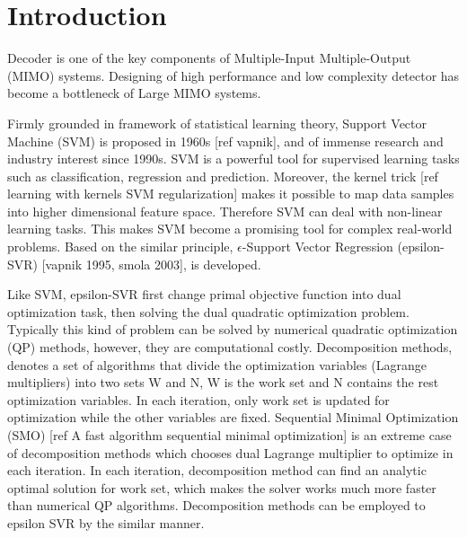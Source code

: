 \documentclass[12pt, draftclsnofoot, onecolumn]{IEEEtran}
\begin{document}
\section{Introduction}
% 
% 
% 
% 

 
Decoder is one of the key components of Multiple-Input Multiple-Output (MIMO) systems. Designing of high performance and low complexity detector has become a bottleneck of Large MIMO systems. 

Firmly grounded in framework of statistical learning theory, Support Vector Machine (SVM) is proposed in 1960s [ref vapnik], and of immense research and industry interest since 1990s. SVM is a powerful tool for supervised learning tasks such as classification, regression and prediction. Moreover, the kernel trick [ref learning with kernels SVM regularization] makes it possible to map data samples into higher dimensional feature space. Therefore SVM can deal with non-linear learning tasks. This makes SVM become a promising tool for complex real-world problems.
Based on the similar principle, $\epsilon$-Support Vector Regression (epsilon-SVR) [vapnik 1995, smola 2003], is developed.

Like SVM, epsilon-SVR first change primal objective function into dual optimization task, then solving the dual quadratic optimization problem. Typically this kind of problem can be solved by numerical quadratic optimization (QP) methods, however, they are computational costly. Decomposition methods, denotes a set of algorithms that divide the optimization variables (Lagrange multipliers) into two sets W and N, W is the work set and N contains the rest optimization variables.  In each iteration, only work set is updated for optimization while the other variables are fixed. Sequential Minimal Optimization (SMO) [ref A fast algorithm sequential minimal optimization] is an extreme case of decomposition methods which chooses dual Lagrange multiplier to optimize in each iteration. In each iteration, decomposition method can find an analytic optimal solution for work set, which makes the solver works much more faster than numerical QP algorithms. Decomposition methods can be employed to epsilon SVR by the similar manner.
\end{document}
